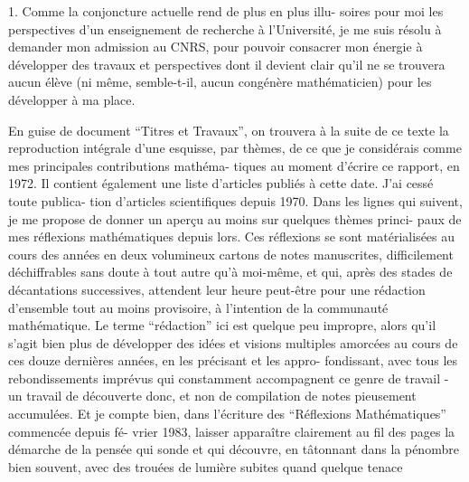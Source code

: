 


1. Comme la conjoncture actuelle rend de plus en plus illu-%
soires pour moi les perspectives d'un enseignement de recherche à
l'Université, je me suis résolu à demander mon admission au CNRS, pour
pouvoir consacrer mon énergie à développer des travaux et perspectives
dont il devient clair qu'il ne se trouvera aucun élève (ni même,
semble-t-il, aucun congénère mathématicien) pour les développer à ma
place.

En guise de document ``Titres et Travaux'', on trouvera à la
suite de ce texte la reproduction intégrale d'une esquisse, par thèmes,
de ce que je considérais comme mes principales contributions mathéma-%
tiques au moment d'écrire ce rapport, en 1972. Il contient également
une liste d'articles publiés à cette date. J'ai cessé toute publica-%
tion d'articles scientifiques depuis 1970. Dans les lignes qui suivent,
je me propose de donner un aperçu au moins sur quelques thèmes princi-%
paux de mes réflexions mathématiques depuis lors. Ces réflexions se
sont matérialisées au cours des années en deux volumineux cartons de
notes manuscrites, difficilement déchiffrables sans doute à tout autre
qu'à moi-même, et qui, après des stades de décantations successives,
attendent leur heure peut-être pour une rédaction d'ensemble tout au
moins provisoire, à l'intention de la communauté mathématique. Le
terme ``rédaction'' ici est quelque peu impropre, alors qu'il s'agit
bien plus de développer des idées et visions multiples amorcées au
cours de ces douze dernières années, en les précisant et les appro-%
fondissant, avec tous les rebondissements imprévus qui constamment
accompagnent ce genre de travail - un travail de découverte donc, et
non de compilation de notes pieusement accumulées. Et je compte bien,
dans l'écriture des ``Réflexions Mathématiques'' commencée depuis fé-%
vrier 1983, laisser apparaître clairement au fil des pages la démarche
de la pensée qui sonde et qui découvre, en tâtonnant dans la pénombre
bien souvent, avec des trouées de lumière subites quand quelque tenace

